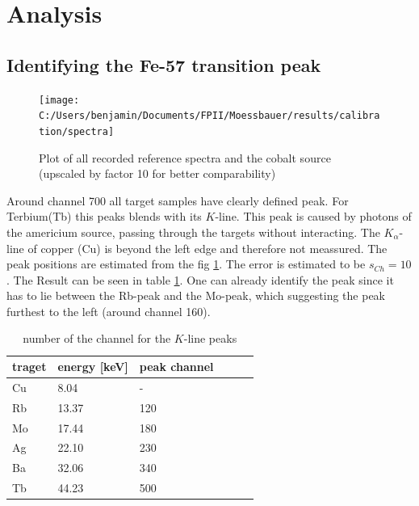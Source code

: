 \section{Analysis}
\subsection{Identifying the Fe-57 transition peak}
\begin{figure}[H]
\centering
\texttt{[image: C:/Users/benjamin/Documents/FPII/Moessbauer/results/calibration/spectra]}
\caption[Reference spectra]{Plot of all recorded reference spectra and the cobalt source (upscaled by factor 10 for better comparability)}
\label{fig:analysis:spectra}
\end{figure}
Around channel 700 all target samples have clearly defined peak. For Terbium(Tb) this peaks blends with its $K$-line. This peak is caused by photons of the americium source, passing through the targets without interacting. The $K_\alpha$-line of copper (Cu) is beyond the left edge and therefore not meassured. The peak positions are estimated from the fig \ref{fig:analysis:spectra}. The error is estimated to be $s_{Ch}=10$. The Result can be seen in table \ref{tb:analysis:peakpos}. One can already identify the peak since it has to lie between the Rb-peak and the Mo-peak, which suggesting the peak furthest to the left (around channel 160).

\begin{table}[H]\centering
	\begin{tabular}{@{}llllll@{}}
		\toprule
		 traget & energy [keV]& peak channel  \\
		\midrule
		Cu & 8.04 & - \\
		Rb & 13.37 & 120 \\
		Mo & 17.44 & 180 \\
		Ag & 22.10 & 230 \\
		Ba & 32.06 & 340 \\
		Tb & 44.23 & 500\\
		\bottomrule
	\end{tabular}
	\caption[peak positions]{number of the channel for the $K$-line peaks}
	\label{tb:analysis:peakpos}
\end{table}

